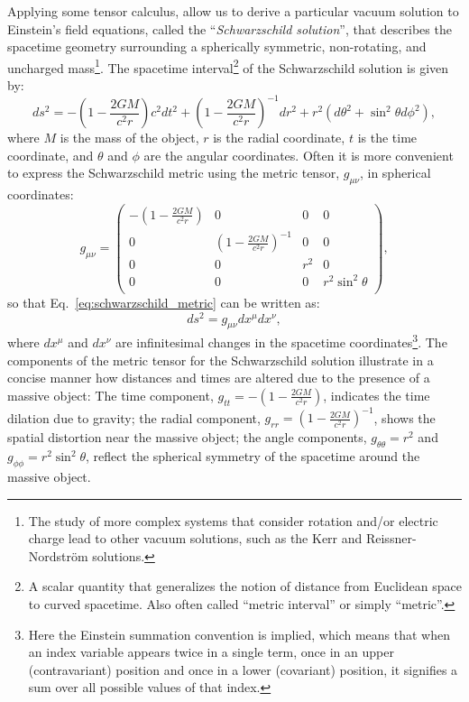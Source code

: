 \documentclass[main.tex]{subfiles}
\begin{document}
    Applying some tensor calculus, allow us to derive a particular vacuum solution to Einstein's field equations, called the ``\textit{Schwarzschild solution}'', that describes the spacetime geometry surrounding a spherically symmetric, non-rotating, and uncharged mass\footnote{The study of more complex systems that consider rotation and/or electric charge lead to other vacuum solutions, such as the Kerr and Reissner-Nordstr\"om solutions.}. The spacetime interval\footnote{A scalar quantity that generalizes the notion of distance from Euclidean space to curved spacetime. Also often called ``metric interval'' or simply ``metric''.} of the Schwarzschild solution is given by:
    \begin{equation}\label{eq:schwarzschild_metric}
        ds^2 = -\left(1 - \frac{2GM}{c^2r}\right)c^2dt^2 + \left(1 - \frac{2GM}{c^2r}\right)^{-1}dr^2 + r^2(d\theta^2 + \sin^2\theta d\phi^2),
    \end{equation}
    where $M$ is the mass of the object, $r$ is the radial coordinate, $t$ is the time coordinate, and $\theta$ and $\phi$ are the angular coordinates. 
    Often it is more convenient to express the Schwarzschild metric using the metric tensor, $g_{\mu \nu}$, in spherical coordinates:
    \begin{equation}\label{eq:schwarzschild_metric_matrix}
        g_{\mu\nu} = 
        \begin{pmatrix}
        -\left(1 - \frac{2GM}{c^2r}\right) & 0 & 0 & 0 \\
        0 & \left(1 - \frac{2GM}{c^2r}\right)^{-1} & 0 & 0 \\
        0 & 0 & r^2 & 0 \\
        0 & 0 & 0 & r^2\sin^2\theta \\
        \end{pmatrix},
    \end{equation}
    so that Eq.~\eqref{eq:schwarzschild_metric} can be written as:
    \begin{equation}\label{eq:schwarzschild_metric2}
        ds^2 = g_{\mu \nu}dx^\mu dx^\nu,
    \end{equation}
    where $dx^\mu$ and $dx^\nu$ are infinitesimal changes in the spacetime coordinates\footnote{Here the Einstein summation convention is implied, which means that when an index variable appears twice in a single term, once in an upper (contravariant) position and once in a lower (covariant) position, it signifies a sum over all possible values of that index.}.
    The components of the metric tensor for the Schwarzschild solution illustrate in a concise manner how distances and times are altered due to the presence of a massive object: The time component, $g_{tt} = -\left(1 - \frac{2GM}{c^2r}\right)$, indicates the time dilation due to gravity; the radial component, $g_{rr} = \left(1 - \frac{2GM}{c^2r}\right)^{-1}$, shows the spatial distortion near the massive object; the angle components, $g_{\theta\theta} = r^2$ and $g_{\phi\phi} = r^2\sin^2\theta$, reflect the spherical symmetry of the spacetime around the massive object. 
\end{document}
